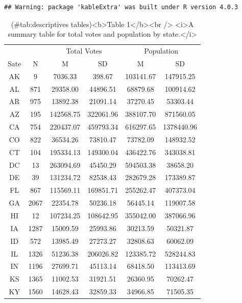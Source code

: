 \documentclass[
  english,
  man]{apa6}
\begin{document}
\begin{verbatim}
## Warning: package 'kableExtra' was built under R version 4.0.3
\end{verbatim}

\begin{table}

\caption{(\#tab:descriptives tables)<b>Table 1</b><br /> <i>A summary table for total votes and population by state.</i>}
\centering
\begin{tabular}[t]{c|c|c|c|c|c}
\hline
\multicolumn{2}{c|}{ } & \multicolumn{2}{c|}{Total Votes} & \multicolumn{2}{c}{Population} \\
\cline{3-4} \cline{5-6}
Sate & N & M & SD & M & SD\\
\hline
AK & 9 & 7036.33 & 398.67 & 103141.67 & 147915.25\\
\hline
AL & 871 & 29358.00 & 44896.51 & 68879.68 & 100914.62\\
\hline
AR & 975 & 13892.38 & 21091.14 & 37270.45 & 53303.44\\
\hline
AZ & 195 & 142568.75 & 322061.96 & 388107.70 & 871560.05\\
\hline
CA & 754 & 220437.07 & 459793.34 & 616297.65 & 1378440.96\\
\hline
CO & 822 & 36534.26 & 73810.47 & 73782.09 & 148932.52\\
\hline
CT & 104 & 195334.13 & 149300.04 & 436422.76 & 343038.81\\
\hline
DC & 13 & 263094.69 & 45450.29 & 594503.38 & 38658.20\\
\hline
DE & 39 & 131234.72 & 82538.43 & 282679.28 & 173389.87\\
\hline
FL & 867 & 115569.11 & 169851.71 & 255262.47 & 407373.04\\
\hline
GA & 2067 & 22354.78 & 50236.18 & 56445.14 & 119007.58\\
\hline
HI & 12 & 107234.25 & 108642.95 & 355042.00 & 387066.96\\
\hline
IA & 1287 & 15009.59 & 25993.86 & 30213.59 & 50321.87\\
\hline
ID & 572 & 13985.49 & 27273.27 & 32808.63 & 60062.09\\
\hline
IL & 1326 & 51236.38 & 206026.82 & 123385.72 & 528244.83\\
\hline
IN & 1196 & 27699.71 & 45113.14 & 68418.50 & 113413.69\\
\hline
KS & 1365 & 11002.53 & 31921.51 & 26360.95 & 70262.47\\
\hline
KY & 1560 & 14628.43 & 32859.33 & 34966.85 & 71505.35\\

\end{tabular}
\end{table}
\end{document}
